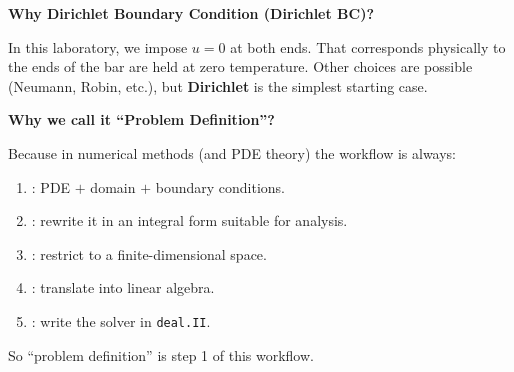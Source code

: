 \begin{flushleft}
    \textcolor{Green3}{ \textbf{Why Dirichlet Boundary Condition (Dirichlet BC)?}}
\end{flushleft}
In this laboratory, we impose $u=0$ at both ends. That corresponds physically to the ends of the bar are held at zero temperature. Other choices are possible (Neumann, Robin, etc.), but \textbf{Dirichlet} is the simplest starting case.

\highspace
\begin{flushleft}
    \textcolor{Green3}{ \textbf{Why we call it ``Problem Definition''?}}
\end{flushleft}
Because in numerical methods (and PDE theory) the workflow is always:
\begin{enumerate}
    \item {}: PDE $+$ domain $+$ boundary conditions.
    \item {}: rewrite it in an integral form suitable for analysis.
    \item {}: restrict to a finite-dimensional space.
    \item {}: translate into linear algebra.
    \item {}: write the solver in \texttt{deal.II}.
\end{enumerate}
So ``problem definition'' is step 1 of this workflow.

